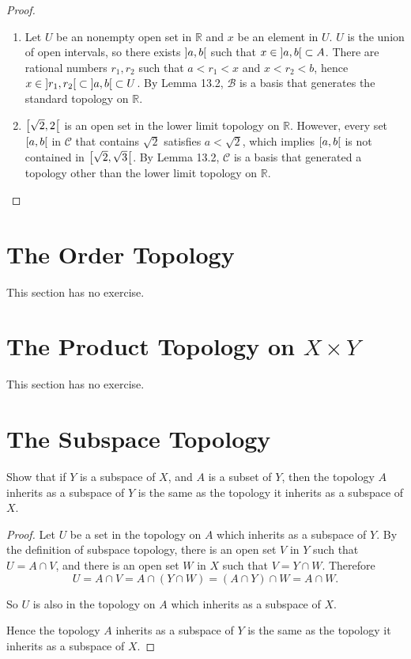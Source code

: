 \begin{proof}
    \begin{enumerate}[label={(\alph*)}]
        \item Let $U$ be an nonempty open set in $\mathbb{R}$ and $x$ be an element in $U$. $U$ is the union of open intervals, so there exists $\left]{a, b}\right[$ such that $x\in \left]{a, b}\right[\subset A$. There are rational numbers $r_{1}, r_{2}$ such that $a < r_{1} < x$ and $x < r_{2} < b$, hence $x\in\left]{r_{1}, r_{2}}\right[\subset \left]{a, b}\right[\subset U$. By Lemma 13.2, $\mathscr{B}$ is a basis that generates the standard topology on $\mathbb{R}$.
        \item $\left[{\sqrt{2}, 2}\right[$ is an open set in the lower limit topology on $\mathbb{R}$. However, every set $\left[{a, b}\right[$ in $\mathscr{C}$ that contains $\sqrt{2}$ satisfies $a < \sqrt{2}$, which implies $\left[{a, b}\right[$ is not contained in $\left[{\sqrt{2}, \sqrt{3}}\right[$. By Lemma 13.2, $\mathscr{C}$ is a basis that generated a topology other than the lower limit topology on $\mathbb{R}$.
    \end{enumerate}
\end{proof}

\section{The Order Topology}

This section has no exercise.

\section{The Product Topology on $X\times Y$}

This section has no exercise.

\section{The Subspace Topology}

\begin{exercise}\label{chapter2:section16:exercise1}
    Show that if $Y$ is a subspace of $X$, and $A$ is a subset of $Y$, then the topology $A$ inherits as a subspace of $Y$ is the same as the topology it inherits as a subspace of $X$.
\end{exercise}

\begin{proof}
    Let $U$ be a set in the topology on $A$ which inherits as a subspace of $Y$. By the definition of subspace topology, there is an open set $V$ in $Y$ such that $U = A\cap V$, and there is an open set $W$ in $X$ such that $V = Y\cap W$. Therefore
    \[
        U = A\cap V = A\cap (Y\cap W) = (A\cap Y)\cap W = A\cap W.
    \]

    So $U$ is also in the topology on $A$ which inherits as a subspace of $X$.

    Hence the topology $A$ inherits as a subspace of $Y$ is the same as the topology it inherits as a subspace of $X$.
\end{proof}

